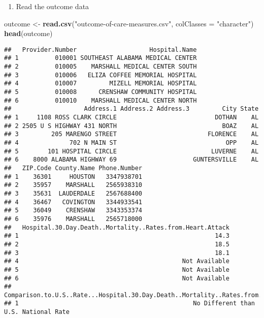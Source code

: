 \documentclass[]{article}
\newenvironment{Shaded}{\begin{snugshade}}{\end{snugshade}}
\newcommand{\KeywordTok}[1]{\textcolor[rgb]{0.13,0.29,0.53}{\textbf{#1}}}
\newcommand{\DataTypeTok}[1]{\textcolor[rgb]{0.13,0.29,0.53}{#1}}
\newcommand{\StringTok}[1]{\textcolor[rgb]{0.31,0.60,0.02}{#1}}
\newcommand{\NormalTok}[1]{#1}
\providecommand{\tightlist}{%
  \setlength{\itemsep}{0pt}\setlength{\parskip}{0pt}}
\begin{document}
\begin{enumerate}
\def\labelenumi{\arabic{enumi}.}
\setcounter{enumi}{1}
\tightlist
\item
  Read the outcome data
\end{enumerate}

\begin{Shaded}
\begin{Highlighting}[]
\NormalTok{outcome <-}\StringTok{ }\KeywordTok{read.csv}\NormalTok{(}\StringTok{"outcome-of-care-measures.csv"}\NormalTok{, }\DataTypeTok{colClasses =} \StringTok{"character"}\NormalTok{)}
\KeywordTok{head}\NormalTok{(outcome)}
\end{Highlighting}
\end{Shaded}

\begin{verbatim}
##   Provider.Number                    Hospital.Name
## 1          010001 SOUTHEAST ALABAMA MEDICAL CENTER
## 2          010005    MARSHALL MEDICAL CENTER SOUTH
## 3          010006   ELIZA COFFEE MEMORIAL HOSPITAL
## 4          010007         MIZELL MEMORIAL HOSPITAL
## 5          010008      CRENSHAW COMMUNITY HOSPITAL
## 6          010010    MARSHALL MEDICAL CENTER NORTH
##                    Address.1 Address.2 Address.3         City State
## 1     1108 ROSS CLARK CIRCLE                           DOTHAN    AL
## 2 2505 U S HIGHWAY 431 NORTH                             BOAZ    AL
## 3         205 MARENGO STREET                         FLORENCE    AL
## 4              702 N MAIN ST                              OPP    AL
## 5        101 HOSPITAL CIRCLE                          LUVERNE    AL
## 6    8000 ALABAMA HIGHWAY 69                     GUNTERSVILLE    AL
##   ZIP.Code County.Name Phone.Number
## 1    36301     HOUSTON   3347938701
## 2    35957    MARSHALL   2565938310
## 3    35631  LAUDERDALE   2567688400
## 4    36467   COVINGTON   3344933541
## 5    36049    CRENSHAW   3343353374
## 6    35976    MARSHALL   2565718000
##   Hospital.30.Day.Death..Mortality..Rates.from.Heart.Attack
## 1                                                      14.3
## 2                                                      18.5
## 3                                                      18.1
## 4                                             Not Available
## 5                                             Not Available
## 6                                             Not Available
##   Comparison.to.U.S..Rate...Hospital.30.Day.Death..Mortality..Rates.from.Heart.Attack
## 1                                                No Different than U.S. National Rate

\end{verbatim}
\end{document}

